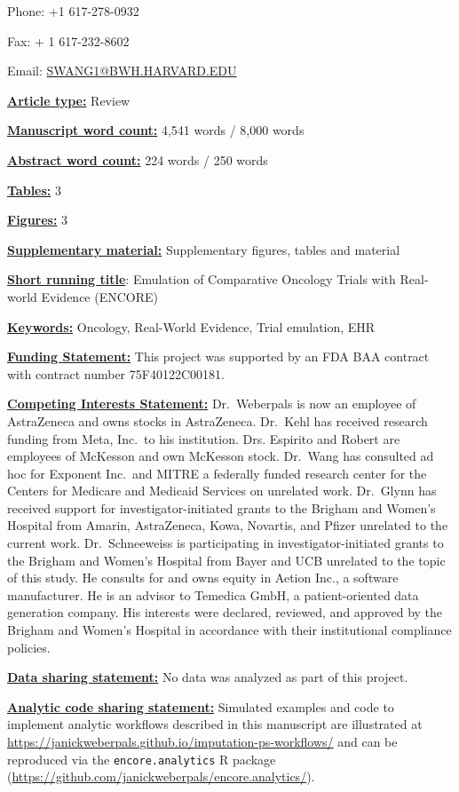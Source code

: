 \documentclass[
  letterpaper,
  DIV=11,
  numbers=noendperiod]{scrartcl}
\begin{document}
Phone: +1 617-278-0932

Fax: + 1 617-232-8602

Email: \url{SWANG1@BWH.HARVARD.EDU}

\ul{\textbf{Article type:}} Review

\ul{\textbf{Manuscript word count:}} 4,541 words / 8,000 words

\ul{\textbf{Abstract word count:}} 224 words / 250 words

\ul{\textbf{Tables:}} 3

\ul{\textbf{Figures:}} 3

\ul{\textbf{Supplementary material:}} Supplementary figures, tables and
material

\ul{\textbf{Short running title}}: Emulation of Comparative Oncology
Trials with Real-world Evidence (ENCORE)

\ul{\textbf{Keywords:}} Oncology, Real-World Evidence, Trial emulation,
EHR

\ul{\textbf{Funding Statement:}} This project was supported by an FDA
BAA contract with contract number 75F40122C00181.

\ul{\textbf{Competing Interests Statement:}} Dr.~Weberpals is now an
employee of AstraZeneca and owns stocks in AstraZeneca. Dr.~Kehl has
received research funding from Meta, Inc.~to his institution. Drs.
Espirito and Robert are employees of McKesson and own McKesson stock.
Dr.~Wang has consulted ad hoc for Exponent Inc.~and MITRE a federally
funded research center for the Centers for Medicare and Medicaid
Services on unrelated work. Dr.~Glynn has received support for
investigator-initiated grants to the Brigham and Women's Hospital from
Amarin, AstraZeneca, Kowa, Novartis, and Pfizer unrelated to the current
work. Dr.~Schneeweiss is participating in investigator-initiated grants
to the Brigham and Women's Hospital from Bayer and UCB unrelated to the
topic of this study. He consults for and owns equity in Aetion Inc., a
software manufacturer. He is an advisor to Temedica GmbH, a
patient-oriented data generation company. His interests were declared,
reviewed, and approved by the Brigham and Women's Hospital in accordance
with their institutional compliance policies.

\ul{\textbf{Data sharing statement:}} No data was analyzed as part of
this project.

\ul{\textbf{Analytic code sharing statement:}} Simulated examples and
code to implement analytic workflows described in this manuscript are
illustrated at
\url{https://janickweberpals.github.io/imputation-ps-workflows/} and can
be reproduced via the \texttt{encore.analytics} R package
(\url{https://github.com/janickweberpals/encore.analytics/}).
\end{document}
